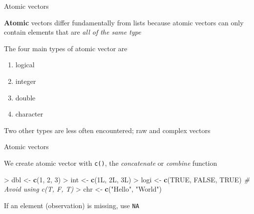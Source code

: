 \documentclass[10pt,ignorenonframetext,compress, aspectratio=169]{beamer}
\newenvironment{Shaded}{\begin{snugshade}}{\end{snugshade}}
\newcommand{\KeywordTok}[1]{\textcolor[rgb]{0.13,0.29,0.53}{\textbf{{#1}}}}
\newcommand{\DecValTok}[1]{\textcolor[rgb]{0.00,0.00,0.81}{{#1}}}
\newcommand{\StringTok}[1]{\textcolor[rgb]{0.31,0.60,0.02}{{#1}}}
\newcommand{\CommentTok}[1]{\textcolor[rgb]{0.56,0.35,0.01}{\textit{{#1}}}}
\newcommand{\OtherTok}[1]{\textcolor[rgb]{0.56,0.35,0.01}{{#1}}}
\newcommand{\NormalTok}[1]{{#1}}
\providecommand{\tightlist}{%
  \setlength{\itemsep}{0pt}\setlength{\parskip}{0pt}}
\begin{document}
\begin{frame}{Atomic vectors}

\textbf{Atomic} vectors differ fundamentally from lists because atomic
vectors can only contain elements that are \emph{all of the same type}

The four main types of atomic vector are

\begin{enumerate}
\def\labelenumi{\arabic{enumi}.}
\tightlist
\item
  logical
\item
  integer
\item
  double
\item
  character
\end{enumerate}

Two other types are less often encountered; raw and complex vectors

\end{frame}

\begin{frame}[fragile]{Atomic vectors}

We create atomic vector with \texttt{c()}, the \emph{concatenate} or
\emph{combine} function

\begin{Shaded}
\begin{Highlighting}[]
\NormalTok{>}\StringTok{ }\NormalTok{dbl <-}\StringTok{ }\KeywordTok{c}\NormalTok{(}\DecValTok{1}\NormalTok{, }\DecValTok{2}\NormalTok{, }\DecValTok{3}\NormalTok{)}
\NormalTok{>}\StringTok{ }\NormalTok{int <-}\StringTok{ }\KeywordTok{c}\NormalTok{(1L, 2L, 3L)}
\NormalTok{>}\StringTok{ }\NormalTok{logi <-}\StringTok{ }\KeywordTok{c}\NormalTok{(}\OtherTok{TRUE}\NormalTok{, }\OtherTok{FALSE}\NormalTok{, }\OtherTok{TRUE}\NormalTok{)            }\CommentTok{# Avoid using c(T, F, T)}
\NormalTok{>}\StringTok{ }\NormalTok{chr <-}\StringTok{ }\KeywordTok{c}\NormalTok{(}\StringTok{"Hello"}\NormalTok{, }\StringTok{"World"}\NormalTok{)}
\end{Highlighting}
\end{Shaded}

If an element (observation) is missing, use \texttt{NA}

\end{frame}
\end{document}
